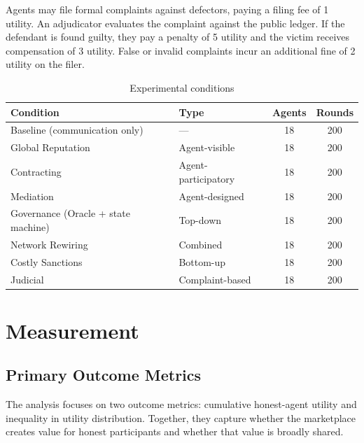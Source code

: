 \documentclass{article}
\begin{document}
Agents may file formal complaints against defectors, paying a filing fee of 1 utility. An adjudicator evaluates the complaint against the public ledger. If the defendant is found guilty, they pay a penalty of 5 utility and the victim receives compensation of 3 utility. False or invalid complaints incur an additional fine of 2 utility on the filer.

\begin{table}[H]
\centering
\begin{tabular}{@{}llcc@{}}
\toprule
Condition & Type & Agents & Rounds \\
\midrule
Baseline (communication only)       & ---                  & 18 & 200 \\
Global Reputation                   & Agent-visible        & 18 & 200 \\
Contracting                         & Agent-participatory  & 18 & 200 \\
Mediation                           & Agent-designed       & 18 & 200 \\
Governance (Oracle + state machine) & Top-down             & 18 & 200 \\
Network Rewiring       & Combined             & 18 & 200 \\
Costly Sanctions                    & Bottom-up            & 18 & 200 \\
Judicial                            & Complaint-based      & 18 & 200 \\
\bottomrule
\end{tabular}
\caption{Experimental conditions}
\label{tab:conditions}
\end{table}

\section{Measurement}
\label{sec:measurement}

\subsection{Primary Outcome Metrics}

The analysis focuses on two outcome metrics: cumulative honest-agent utility and inequality in utility distribution. Together, they capture whether the marketplace creates value for honest participants and whether that value is broadly shared.
\end{document}
